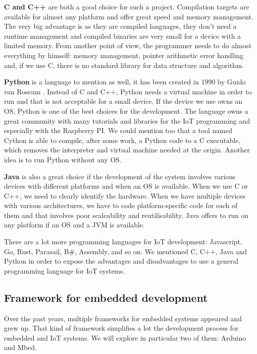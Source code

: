 \textbf{C and C++} are both a good choice for such a project. Compilation targets are
available for almost any platform and offer great speed and memory management.
The very big advantage is as they are compiled languages, they don't need a
runtime management and compiled binaries are very small for a device with a
limited memory. From another point of view, the programmer needs to do almost
everything by himself: memory management, pointer arithmetic error handling
and, if we use C, there is no standard library for data structure and algorithm.

\textbf{Python} is a language to mention as well, it has been created in 1990
by Guido van Rossum \cite{Rossum:1995:PRM:869369}. Instead of C and C++, Python
needs a virtual machine in order to run and that is not acceptable for a small
device. If the device we use owns an \gls{OS}, Python is one of the best choices
for the development. The language owns a great community with many tutorials
and libraries for the \gls{IoT} programming and especially with the Raspberry PI. We
could mention too that a tool named Cython\cite{behnel2010cython} is able to
compile, after some work, a Python code to a C executable, which removes the
interpreter and virtual machine needed at the origin. Another idea is to run
Python without any \gls{OS}\cite{jakeedge2015}.

\textbf{Java} is also a great choice if the development of the system involves
various devices with different platforms and when an \gls{OS} is available. When we use C
or C++, we need to clearly identify the hardware. When we have
multiple devices with various architectures, we have to code platform-specific
code for each of them and that involves poor scaleability and reutilisability.
Java offers to run on any platform if an \gls{OS} and a \gls{JVM} is available.

There are a lot more programming languages for \gls{IoT} development: Javascript,
Go, Rust, Parasail, B\#, Assembly, and so on. We mentioned C, C++, Java and
Python in order to expose the advantages and disadvantages to use a general
programming language for \gls{IoT} systems.

\subsection{Framework for embedded development}
\label{sec:framework_for_embeded_dev}

Over the past years, multiple frameworks for embedded systems appeared and grew up.
That kind of framework simplifies a lot the development process for embedded and
\gls{IoT} systems. We will explore in particular two of them: Arduino and
Mbed.

